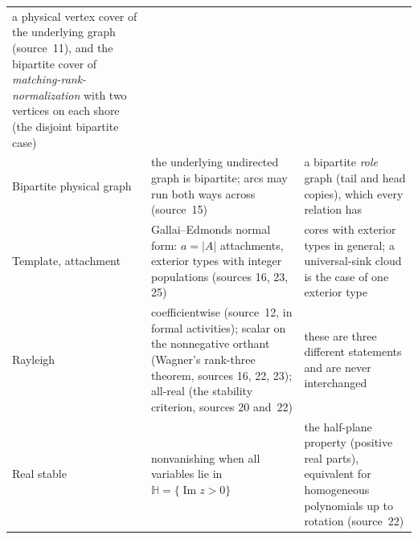 \documentclass[11pt]{article}
\numberwithin{equation}{section}
\theoremstyle{definition}\newtheorem{definition}[theorem]{Definition}\newtheorem{remark}[theorem]{Remark}
\newcommand{\HH}{\mathbb H}                %
\newcommand{\mrn}{\emph{matching-rank-normalization}}
\begin{document}
\begin{center}
\begin{longtable}{p{28mm}p{60mm}p{56mm}}
  a physical vertex cover of the underlying graph (source~11), and the
  bipartite cover of \mrn{} with two vertices on each shore (the disjoint
  bipartite case)\\
Bipartite physical graph & the underlying undirected graph is bipartite;
  arcs may run both ways across (source~15) & a bipartite \emph{role}
  graph (tail and head copies), which every relation has\\
Template, attachment & Gallai--Edmonds normal form: $a=|A|$ attachments,
  exterior types with integer populations (sources 16, 23, 25) & cores
  with exterior types in general; a universal-sink cloud is the case of
  one exterior type\\
Rayleigh & coefficientwise (source~12, in formal activities); scalar on
  the nonnegative orthant (Wagner's rank-three theorem, sources 16, 22,
  23); all-real (the stability criterion, sources 20 and~22) & these are
  three different statements and are never interchanged\\
Real stable & nonvanishing when all variables lie in
  $\HH=\{\operatorname{Im}z>0\}$ & the half-plane property (positive real
  parts), equivalent for homogeneous polynomials up to rotation
  (source~22)\\\bottomrule
\end{longtable}
\end{center}
\end{document}
